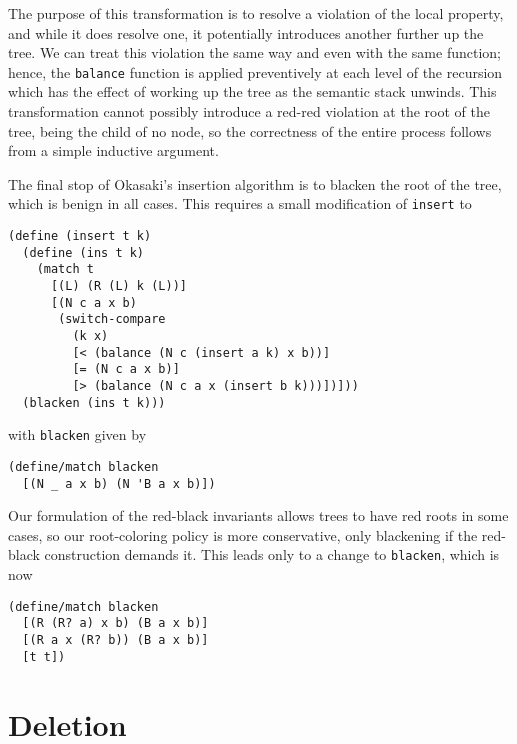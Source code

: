 \documentclass[preprint]{sigplanconf}
\begin{document}
The purpose of this transformation is to resolve a violation of the local property, and while it does resolve one, it potentially introduces another further up the tree. We can treat this violation the same way and even with the same function; hence, the \texttt{balance} function is applied preventively at each level of the recursion which has the effect of working up the tree as the semantic stack unwinds. This transformation cannot possibly introduce a red-red violation at the root of the tree, being the child of no node, so the correctness of the entire process follows from a simple inductive argument.

The final stop of Okasaki's insertion algorithm is to blacken the root of the tree, which is benign in all cases. This requires a small modification of \texttt{insert} to 
\begin{verbatim}
(define (insert t k)
  (define (ins t k)
    (match t
      [(L) (R (L) k (L))]
      [(N c a x b)
       (switch-compare
         (k x)
         [< (balance (N c (insert a k) x b))]
         [= (N c a x b)]
         [> (balance (N c a x (insert b k)))])]))
  (blacken (ins t k)))
\end{verbatim}
with \texttt{blacken} given by
\begin{verbatim}
(define/match blacken
  [(N _ a x b) (N 'B a x b)])
\end{verbatim}

Our formulation of the red-black invariants allows trees to have red roots in some cases, so our root-coloring policy is more conservative, only blackening if the red-black construction demands it. This leads only to a change to \texttt{blacken}, which is now
\begin{verbatim}
(define/match blacken
  [(R (R? a) x b) (B a x b)]
  [(R a x (R? b)) (B a x b)]
  [t t])
\end{verbatim}

\section{Deletion}
\end{document}

